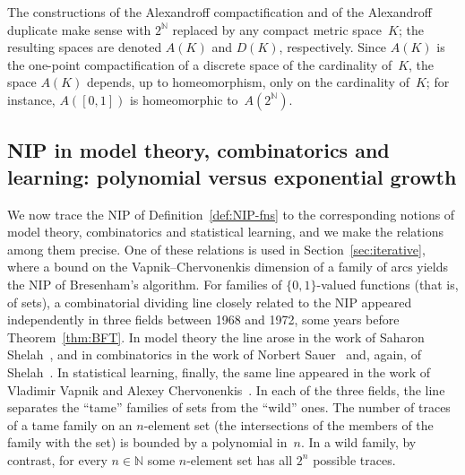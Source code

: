 \documentclass[psamsfonts]{amsart}
\theoremstyle{definition}
\theoremstyle{remark}
\numberwithin{equation}{section}
\begin{document}
The constructions of the Alexandroff compactification and of the Alexandroff duplicate make sense with $2^{\mathbb{N}}$ replaced by any compact metric space~$K$;
the resulting spaces are denoted $A(K)$ and $D(K)$, respectively.
Since $A(K)$ is the one-point compactification of a discrete space of the cardinality of~$K$, the space $A(K)$ depends, up to homeomorphism, only on the cardinality of~$K$;
for instance, $A([0,1])$ is homeomorphic to~$A(2^{\mathbb{N}})$.

\subsection{NIP in model theory, combinatorics and learning: polynomial versus exponential growth}
\label{sec:NIP-poly-exp}

We now trace the NIP of Definition~\ref{def:NIP-fns} to the corresponding notions of model theory, combinatorics and statistical learning, and we make the relations among them precise.
One of these relations is used in Section~\ref{sec:iterative}, where a bound on the Vapnik--Chervonenkis dimension of a family of arcs yields the NIP of Bresenham’s algorithm.
For families of $\{0,1\}$-valued functions (that is, of sets), a combinatorial dividing line closely related to the NIP appeared independently in three fields between 1968 and 1972, some years before Theorem~\ref{thm:BFT}.
In model theory the line arose in the work of Saharon Shelah~\cite{Shelah:1971,Shelah:1990}, and in combinatorics in the work of Norbert Sauer~\cite{Sauer:1972} and, again, of Shelah~\cite{Shelah:1972,Shelah:1990}.
In statistical learning, finally, the same line appeared in the work of Vladimir Vapnik and Alexey Chervonenkis~\cite{Vapnik-Chervonenkis:1968,Vapnik-Chervonenkis:1971,Vapnik-Chervonenkis:1974}.
In each of the three fields, the line separates the “tame” families of sets from the “wild” ones.
The number of traces of a tame family on an $n$-element set (the intersections of the members of the family with the set) is bounded by a polynomial in~$n$.
In a wild family, by contrast, for every $n\in\mathbb{N}$ some $n$-element set has all $2^n$ possible traces.
\end{document}
